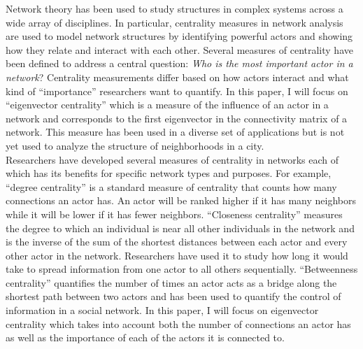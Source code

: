 \documentclass{article}
\theoremstyle{definition}
\theoremstyle{remark}
\begin{document}
Network theory has been used to study structures in complex systems across a wide array of disciplines.  In particular, centrality measures in network analysis are used to model network structures by identifying powerful actors and showing how they relate and interact with each other.  Several measures of centrality have been defined to address a central question: \textit{Who is the most important actor in a network}?  Centrality measurements differ based on how actors interact and what kind of ``importance'' researchers want to quantify.  In this paper, I will focus on ``eigenvector centrality'' which is a measure of the influence of an actor in a network and corresponds to the first eigenvector in the connectivity matrix of a network.  This measure has been used in a diverse set of applications but is not yet used to analyze the structure of neighborhoods in a city. \\

Researchers have developed several measures of centrality in networks each of which has its benefits for specific network types and purposes.  For example, ``degree centrality'' is a standard measure of centrality that counts how many connections an actor has.  An actor will be ranked higher if it has many neighbors while it will be lower if it has fewer neighbors.  ``Closeness centrality'' measures the degree to which an individual is near all other individuals in the network and is the inverse of the sum of the shortest distances between each actor and every other actor in the network.  Researchers have used it to study how long it would take to spread information from one actor to all others sequentially.  ``Betweenness centrality'' quantifies the number of times an actor acts as a bridge along the shortest path between two actors and has been used to quantify the control of information in a social network.  In this paper, I will focus on eigenvector centrality which takes into account both the number of connections an actor has as well as the importance of each of the actors it is connected to.\\
\end{document}
